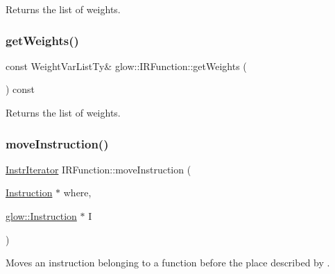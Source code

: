 \begin{DoxyReturn}{Returns}
the list of weights. 
\end{DoxyReturn}
\mbox{\label{classglow_1_1_i_r_function_a58d8ca16575cd947d9b44fcafddfd18f}} 
\subsubsection{\texorpdfstring{get\+Weights()}{getWeights()}\hspace{0.1cm}{\footnotesize\ttfamily [2/2]}}
{\footnotesize\ttfamily const Weight\+Var\+List\+Ty\& glow\+::\+I\+R\+Function\+::get\+Weights (\begin{DoxyParamCaption}{ }\end{DoxyParamCaption}) const\hspace{0.3cm}{\ttfamily [inline]}}

\begin{DoxyReturn}{Returns}
the list of weights. 
\end{DoxyReturn}
\mbox{\label{classglow_1_1_i_r_function_a67e0ae4e7d97fba252dd6921a2cb4b74}} 
\subsubsection{\texorpdfstring{move\+Instruction()}{moveInstruction()}}
{\footnotesize\ttfamily \hyperlink{classglow_1_1tagged__list__details_1_1_iterator}{Instr\+Iterator} I\+R\+Function\+::move\+Instruction (\begin{DoxyParamCaption}\item[{\hyperlink{classglow_1_1_instruction}{Instruction} $\ast$}]{where,  }\item[{\hyperlink{classglow_1_1_instruction}{glow\+::\+Instruction} $\ast$}]{I }\end{DoxyParamCaption})}

Moves an instruction belonging to a function before the place described by . \mbox{\label{classglow_1_1_i_r_function_abab74f68d9282d91dd7fbe004e5b1abc}} 
